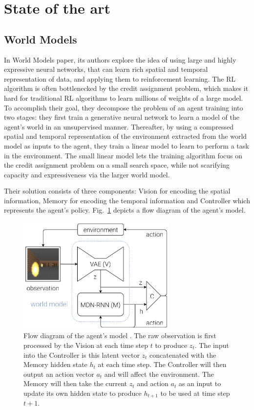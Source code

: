 \section{State of the art}

\subsection{World Models}

 In World Models \cite{Algo.WorldModels} paper, its authors explore the idea of using large and highly expressive neural networks, that can learn rich spatial and temporal representation of data, and applying them to reinforcement learning. The RL algorithm is often bottlenecked by the credit assignment problem, which makes it hard for traditional RL algorithms to learn millions of weights of a large model. To accomplish their goal, they decompose the problem of an agent training into two stages: they first train a generative neural network to learn a model of the agent's world in an unsupervised manner. Thereafter, by using a compressed spatial and temporal representation of the environment extracted from the world model as inputs to the agent, they train a linear model to learn to perform a task in the environment. The small linear model lets the training algorithm focus on the credit assignment problem on a small search space, while not scarifying capacity and expressiveness via the larger world model.

Their solution consists of three components: Vision for encoding the spatial information, Memory for encoding the temporal information and Controller which represents the agent's policy. Fig.~\ref{Fig.WorldModels} depicts a flow diagram of the agent's model.

\begin{figure}[H]
\includegraphics[width=0.7\textwidth,keepaspectratio]{figures/WorldModels.png}
\caption[Flow diagram of the World Models agent's model]{Flow diagram of the agent's model \protect\cite{Algo.WorldModels}. The raw observation is first processed by the Vision at each time step $t$ to produce $z_t$. The input into the Controller is this latent vector $z_t$ concatenated with the Memory hidden state $h_t$ at each time step. The Controller will then output an action vector $a_t$ and will affect the environment. The Memory will then take the current $z_t$ and action $a_t$ as an input to update its own hidden state to produce $h_{t+1}$ to be used at time step $t + 1$.}
\label{Fig.WorldModels}
\end{figure}

